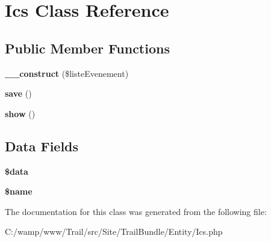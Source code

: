\hypertarget{class_site_1_1_trail_bundle_1_1_entity_1_1_ics}{}\section{Ics Class Reference}
\label{class_site_1_1_trail_bundle_1_1_entity_1_1_ics}
\subsection*{Public Member Functions}
\begin{DoxyCompactItemize}
\item 
\hypertarget{class_site_1_1_trail_bundle_1_1_entity_1_1_ics_a952c13202368b791f288f7b0c2ea955a}{}{\bfseries \+\_\+\+\_\+construct} (\$liste\+Evenement)\label{class_site_1_1_trail_bundle_1_1_entity_1_1_ics_a952c13202368b791f288f7b0c2ea955a}

\item 
\hypertarget{class_site_1_1_trail_bundle_1_1_entity_1_1_ics_afc8a3c62679cf00ade9f15fb2a6d6132}{}{\bfseries save} ()\label{class_site_1_1_trail_bundle_1_1_entity_1_1_ics_afc8a3c62679cf00ade9f15fb2a6d6132}

\item 
\hypertarget{class_site_1_1_trail_bundle_1_1_entity_1_1_ics_a2b8e3779f5bd8c38f70307574859bd36}{}{\bfseries show} ()\label{class_site_1_1_trail_bundle_1_1_entity_1_1_ics_a2b8e3779f5bd8c38f70307574859bd36}

\end{DoxyCompactItemize}
\subsection*{Data Fields}
\begin{DoxyCompactItemize}
\item 
\hypertarget{class_site_1_1_trail_bundle_1_1_entity_1_1_ics_a6efc15b5a2314dd4b5aaa556a375c6d6}{}{\bfseries \$data}\label{class_site_1_1_trail_bundle_1_1_entity_1_1_ics_a6efc15b5a2314dd4b5aaa556a375c6d6}

\item 
\hypertarget{class_site_1_1_trail_bundle_1_1_entity_1_1_ics_ab2fc40d43824ea3e1ce5d86dee0d763b}{}{\bfseries \$name}\label{class_site_1_1_trail_bundle_1_1_entity_1_1_ics_ab2fc40d43824ea3e1ce5d86dee0d763b}

\end{DoxyCompactItemize}


The documentation for this class was generated from the following file\+:\begin{DoxyCompactItemize}
\item 
C\+:/wamp/www/\+Trail/src/\+Site/\+Trail\+Bundle/\+Entity/Ics.\+php\end{DoxyCompactItemize}
